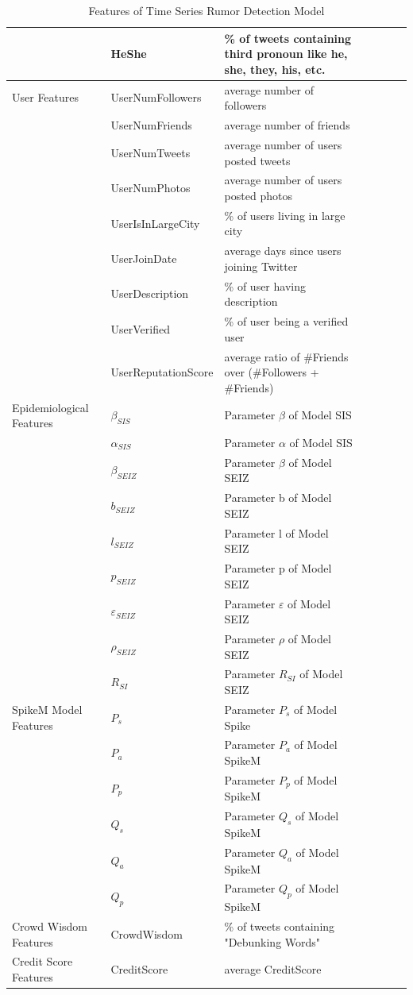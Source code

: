 \begin{table}[!h]
{\begin{tabular}{@{}lllllll@{}}
   & HeShe & \% of tweets containing third pronoun like he, she, they, his, etc. \\ \midrule
   User Features & UserNumFollowers  & average number of followers\\
 	& UserNumFriends  & average number of friends\\
 	& UserNumTweets  & average number of users posted tweets\\
 	& UserNumPhotos  & average number of users posted photos\\
 	& UserIsInLargeCity  & \% of users living in large city\\
 	& UserJoinDate & average days since users joining Twitter\\
 	& UserDescription  & \% of user having description\\
 	& UserVerified  & \% of user being a verified user\\
 	& UserReputationScore & average ratio of \#Friends over (\#Followers + \#Friends)\\   \midrule
 Epidemiological Features & $\beta_{SIS}$ & Parameter $\beta$ of Model SIS\\
 							& $\alpha_{SIS} $ & Parameter $\alpha$ of Model SIS\\
 							& $\beta_{SEIZ}$ & Parameter $\beta$ of Model SEIZ\\
 							& $b_{SEIZ}$ & Parameter b of Model SEIZ\\
 							& $l_{SEIZ}$ & Parameter l of Model SEIZ\\
 							& $p_{SEIZ}$ & Parameter p of Model SEIZ\\
 							& $\varepsilon_{SEIZ}$ & Parameter $\varepsilon$ of Model SEIZ\\
 							& $\rho_{SEIZ}$ & Parameter $\rho$ of Model SEIZ\\
 							& $R_{SI}$ & Parameter $R_{SI}$ of Model SEIZ\\
		\midrule	
 SpikeM Model Features & $P_s$ & Parameter $P_s$ of Model Spike\\
 							& $P_a$ & Parameter $P_a$ of Model SpikeM\\
 							& $P_p$ & Parameter $P_p$ of Model SpikeM\\
 							& $Q_s$  & Parameter $Q_s$ of Model SpikeM\\
 							& $Q_a$ & Parameter $Q_a$ of Model SpikeM\\
 							& $Q_p$ & Parameter $Q_p$ of Model SpikeM\\ \midrule	
 Crowd Wisdom Features & CrowdWisdom & \% of tweets containing "Debunking Words"\\ \midrule
	 
 Credit Score Features & CreditScore & average CreditScore\\
 \bottomrule
 \end{tabular}}
 \caption{Features of Time Series Rumor Detection Model}
 \label{tab:full_features}
\end{table}
